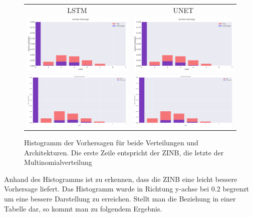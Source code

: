 \begin{figure}[h]
\centering
\begin{tabular}{c|c}
\small{LSTM} & \small{UNET}\\
\includegraphics[width=80mm]{abb/LSTM_LOGBIN.png}&
\includegraphics[width=80mm]{abb/UNET_LOGBIN.png}\\
\hline
\includegraphics[width=80mm]{abb/dist_cat_lstm.png}&
\includegraphics[width=80mm]{abb/dist_cat_unet.png}\\
\end{tabular}
\caption{Histogramm der Vorhersagen für beide Verteilungen und Architekturen. Die erste Zeile entspricht der ZINB, die letzte der Multinomialverteilung \label{fig:logDist}}
\end{figure}

\noindent Anhand des Histogramms ist zu erkennen, dass die ZINB eine leicht bessere Vorhersage liefert. Das Histogramm wurde in Richtung y-achse bei 0.2 begrenzt um eine bessere Darstellung zu erreichen. Stellt man die Beziehung in einer Tabelle dar, so kommt man zu folgendem Ergebnis.\\

